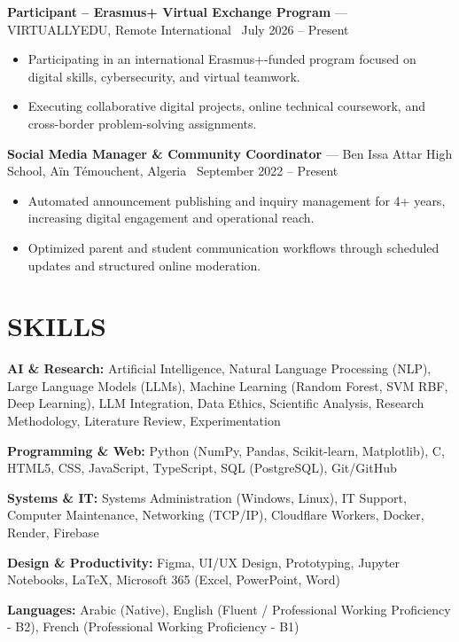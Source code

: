 \documentclass[10.5pt, letterpaper]{article}
\newcommand{\entry}[4]{%
  \noindent\textbf{#1} --- #3, #4 \textbar\ #2\par
  \vspace{2pt}
}
\newcommand{\resumeItem}[1]{\item #1}
\begin{document}
\entry{Participant -- Erasmus+ Virtual Exchange Program}{July 2026 -- Present}{VIRTUALLYEDU}{Remote International}
\begin{itemize}
  \resumeItem{Participating in an international Erasmus+-funded program focused on digital skills, cybersecurity, and virtual teamwork.}
  \resumeItem{Executing collaborative digital projects, online technical coursework, and cross-border problem-solving assignments.}
\end{itemize}

\entry{Social Media Manager \& Community Coordinator}{September 2022 -- Present}{Ben Issa Attar High School}{Aïn Témouchent, Algeria}
\begin{itemize}
  \resumeItem{Automated announcement publishing and inquiry management for 4+ years, increasing digital engagement and operational reach.}
  \resumeItem{Optimized parent and student communication workflows through scheduled updates and structured online moderation.}
\end{itemize}

\section{SKILLS}
\noindent\textbf{AI \& Research:} Artificial Intelligence, Natural Language Processing (NLP), Large Language Models (LLMs), Machine Learning (Random Forest, SVM RBF, Deep Learning), LLM Integration, Data Ethics, Scientific Analysis, Research Methodology, Literature Review, Experimentation\par
\noindent\textbf{Programming \& Web:} Python (NumPy, Pandas, Scikit-learn, Matplotlib), C, HTML5, CSS, JavaScript, TypeScript, SQL (PostgreSQL), Git/GitHub\par
\noindent\textbf{Systems \& IT:} Systems Administration (Windows, Linux), IT Support, Computer Maintenance, Networking (TCP/IP), Cloudflare Workers, Docker, Render, Firebase\par
\noindent\textbf{Design \& Productivity:} Figma, UI/UX Design, Prototyping, Jupyter Notebooks, LaTeX, Microsoft 365 (Excel, PowerPoint, Word)\par
\noindent\textbf{Languages:} Arabic (Native), English (Fluent / Professional Working Proficiency - B2), French (Professional Working Proficiency - B1)

\end{document}
